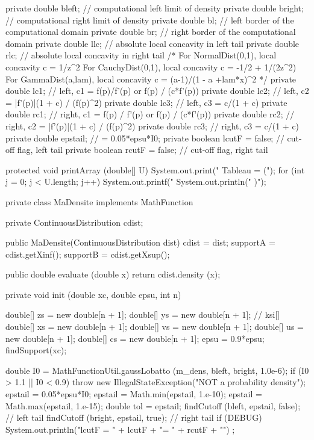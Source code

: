 \begin{code}
\begin{hide}
{   private double bleft;      // computational left limit of density
   private double bright;     // computational right limit of density
   private double bl;         // left border of the computational domain
   private double br;         // right border of the computational domain
   private double llc;        // absolute local concavity in left tail
   private double rlc;        // absolute local concavity in right tail
/*
   For NormalDist(0,1), local concavity c = 1/z^2
   For CauchyDist(0,1), local concavity c = -1/2 + 1/(2z^2)
   For GammaDist(a,lam), local concavity c = (a-1)/(1 - a +lam*x)^2
*/
   private double lc1;        // left, c1 = f(p)/f'(p) or f(p) / (c*f'(p))
   private double lc2;        // left, c2 = |f'(p)|(1 + c) / (f(p)^2)
   private double lc3;        // left, c3 = c/(1 + c)
   private double rc1;        // right, c1 = f(p) / f'(p) or f(p) / (c*f'(p))
   private double rc2;        // right, c2 = |f'(p)|(1 + c) / (f(p)^2)
   private double rc3;        // right, c3 = c/(1 + c)
   private double epstail;    // = 0.05*epsu*I0;
   private boolean lcutF = false;    // cut-off flag, left tail
   private boolean rcutF = false;   // cut-off flag, right tail


   protected void printArray (double[] U) {
      System.out.print("      Tableau = (");
      for (int j = 0; j < U.length; j++)
         System.out.printf("  %
      System.out.println("  )");
   }


   private class MaDensite implements MathFunction {
      private ContinuousDistribution cdist;

      public MaDensite(ContinuousDistribution dist) {
         cdist = dist;
         supportA = cdist.getXinf();
         supportB = cdist.getXsup();
     }

      public double evaluate (double x) {
         return cdist.density (x);
      }
   }


   private void init (double xc, double epsu, int n) {
      double[] zs = new double[n + 1];
      double[] ys = new double[n + 1];   // ksi[]
      double[] xs = new double[n + 1];
      double[] vs = new double[n + 1];
      double[] us = new double[n + 1];
      double[] cs = new double[n + 1];
      epsu = 0.9*epsu;
      findSupport(xc);

      double I0 = MathFunctionUtil.gaussLobatto (m_dens, bleft, bright, 1.0e-6);
      if (I0 > 1.1 || I0 < 0.9)
         throw new IllegalStateException("NOT a probability density");
      epstail = 0.05*epsu*I0;
      epstail = Math.min(epstail, 1.e-10);
      epstail = Math.max(epstail, 1.e-15);
      double tol = epstail;
      findCutoff (bleft, epstail, false);    // left tail
      findCutoff (bright, epstail, true);    // right tail
      if (DEBUG)
         System.out.println("lcutF = " + lcutF + "\nrcutF = " + rcutF + "\n") ;

}}
\end{hide}
\end{code}
